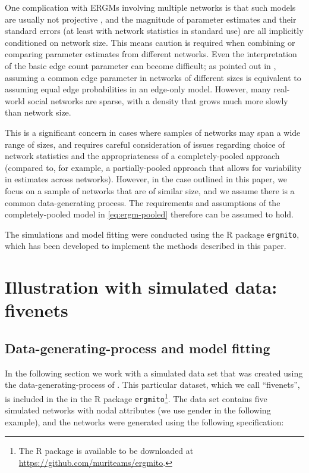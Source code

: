 \documentclass[review]{elsarticle}
\begin{document}
One complication with ERGMs involving multiple networks is that such models are usually not projective \cite{shalizi2013}, and the magnitude of parameter estimates and their standard errors (at least with network statistics in standard use) are all implicitly conditioned on network size. This means caution is required when combining or comparing parameter estimates from different networks. Even the interpretation of the basic edge count parameter can become difficult; as pointed out in \cite{Krivitsky2011}, assuming a common edge parameter in networks of different sizes is equivalent to assuming equal edge probabilities in an edge-only model. However, many real-world social networks are sparse, with a density that grows much more slowly than network size. 

This is a significant concern in cases where samples of networks may span a wide range of sizes, and requires careful consideration of issues regarding choice of network statistics and the appropriateness of a completely-pooled approach (compared to, for example, a partially-pooled approach that allows for variability in estimates across networks). However, in the case outlined in this paper, we focus on a sample of networks that are of similar size, and we assume there is a common data-generating process. The requirements and assumptions of the completely-pooled model in \eqref{eq:ergm-pooled} therefore can be assumed to hold. 

The simulations and model fitting were conducted using the R package \texttt{ergmito}, which has been developed to implement the methods described in this paper.

\section{Illustration with simulated data: fivenets}

\subsection{Data-generating-process and model fitting}

In the following section we work with a simulated data set that was created using the data-generating-process of \ergmitos{}. This particular dataset, which we call ``fivenets'', is included in the in the R package \texttt{ergmito}\footnote{The R package is available to be downloaded at  \url{https://github.com/muriteams/ergmito}.}. The data set contains five simulated networks with nodal attributes (we use gender in the following example), and the networks were generated using the following specification:
\end{document}
